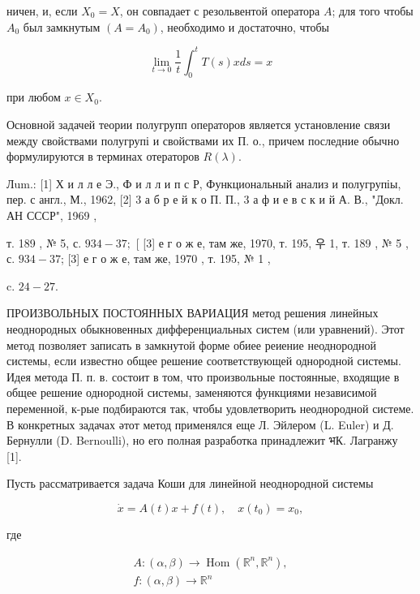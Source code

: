 \documentclass[10pt]{article}
\begin{document}
ничен, и, если $X_{0}=X$, он совпадает с резольвентой оператора $A$; для того чтобы $A_{0}$ был замкнутым $\left(A=A_{0}\right)$, необходимо и достаточно, чтобы



\[

\lim _{t \rightarrow 0} \frac{1}{t} \int_{0}^{t} T(s) x d s=x

\]



при любом $x \in X_{0}$.



Основной задачей теории полугрупп операторов является установление связи между свойствами полугрупі и свойствами их П. о., причем последние обычно формулируются в терминах отераторов $R(\lambda)$.



Лum.: [1] Х и л л е Э., Ф и л л и п с Р, Функциональный анализ и полугрупіы, пер. с англ., М., 1962, [2] 3 а б р е й к о П. П., 3 а ф и е в с к и й А. В., "Докл. АН СССР", 1969 ,

т. 189 , № 5, с. $934-37 ;$ [ [3] е г о ж е, там же, 1970, т. 195, 우 1, т. 189 , № 5 , с. $934-37$; [3] е г о ж е, там же, 1970 , т. 195, № 1 ,

c. $24-27$.



ПРОИЗВОЛЬНЫХ ПОСТОЯННЫХ ВАРИАЦИЯ метод решения линейных неоднородных обыкновенных дифференциальных систем (или уравнений). Этот метод позволяет записать в замкнутой форме обиее реиение неоднородной системы, если известно общее решение соответствующей однородной системы. Идея метода П. п. в. состоит в том, что произвольные постоянные, входящие в общее решение однородной системы, заменяются функциями независимой переменной, к-рые подбираются так, чтобы удовлетворить неоднородной системе. В конкретных задачах әтот метод применялся еще Л. Эйлером (L. Euler) и Д. Бернулли (D. Bernoulli), но его полная разработка принадлежит भК. Лагранжу [1].



Пусть рассматривается задача Коши для линейной неоднородной системы



\[

\dot{x}=A(t) x+f(t), \quad x\left(t_{0}\right)=x_{0},

\]



где



\[

\begin{gathered}

A:(\alpha, \beta) \longrightarrow \operatorname{Hom}\left(\mathbb{R}^{n}, \mathbb{R}^{n}\right), \\

f:(\alpha, \beta) \longrightarrow \mathbb{R}^{n}

\end{gathered}

\]
\end{document}
